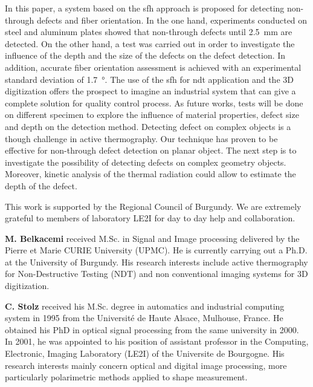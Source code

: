 \documentclass[12pt]{spieman}
\begin{document}
\begin{spacing}{2}
In this paper, a system based on the \ac{sfh} approach is proposed for detecting non-through defects and fiber orientation. 
In the one hand, experiments conducted on steel and aluminum plates showed that non-through defects until \SI{2.5}{\milli \metre} are detected. 
On the other hand, a test was carried out in order to investigate the influence of the depth and the size of the defects on the defect detection.
In addition, accurate fiber orientation assessment is achieved with an experimental standard deviation of \SI{1.7}{\degree}. 
The use of the \ac{sfh} for \ac{ndt} application and the 3D digitization offers the prospect to imagine an industrial system that can give a complete solution for quality control process. 
As future works, tests will be done on different specimen to explore the influence of material properties, defect size and depth on the detection method. 
Detecting defect on complex objects is a though challenge in active thermography. 
Our technique has proven to be effective for non-through defect detection on planar object. 
The next step is to investigate the possibility of detecting defects on complex geometry objects.   
Moreover, kinetic analysis of the thermal radiation could allow to estimate the depth of the defect.

% 

\acknowledgments     %

This work is supported by the Regional Council of Burgundy. We are extremely grateful to members of laboratory LE2I for day to day help and collaboration.


\newpage


\newpage

\vspace{2ex}\noindent\textbf{M. Belkacemi} received M.Sc. in Signal and Image processing delivered by the Pierre et Marie CURIE University (UPMC). 
He is currently carrying out a Ph.D. at the University of Burgundy. His research interests include active thermography for Non-Destructive Testing (NDT) and non conventional imaging systems for 3D digitization.

\vspace{2ex}\noindent\textbf{C. Stolz} received his M.Sc. degree in automatics and industrial computing system in 1995 from the Université de Haute Alsace, Mulhouse, France. He obtained his PhD in optical signal processing from the same university in 2000. In 2001, he was appointed to his position of assistant professor in the Computing, Electronic, Imaging Laboratory (LE2I) of the Universite de Bourgogne. His research interests mainly concern optical and digital image processing, more particularly polarimetric methods applied to shape measurement.


\end{spacing}
\end{document}
